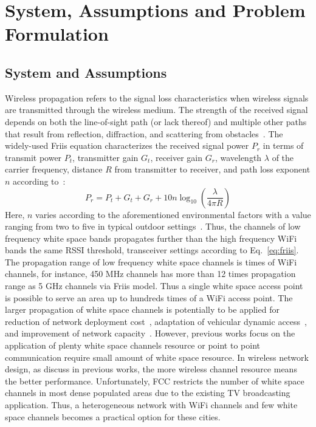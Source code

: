\section{System, Assumptions and Problem Formulation}
\label{sec:problemformulation}

\subsection{System and Assumptions}
\label{subsec:model}

Wireless propagation refers to the signal loss characteristics when wireless signals 
are transmitted through the wireless medium. The strength of the received signal depends on 
both the line-of-sight path (or lack thereof) and multiple other paths that result from reflection, 
diffraction, and scattering from obstacles~\cite{andersen1995propagation}. The widely-used Friis
equation characterizes the received signal power $P_r$ in terms of transmit power $P_t$, transmitter 
gain $G_t$, receiver gain $G_r$, wavelength $\lambda$ of the carrier frequency, distance $R$ from 
transmitter to receiver, and path loss exponent $n$ according to~\cite{friis}:
\begin{equation}
\label{eq:friis}
P_r=P_t+G_t+G_r+10n \log_{10}\left( \frac{\lambda}{4\pi R}\right)
\end{equation}
Here, $n$ varies according to the aforementioned environmental 
factors with a value ranging from two to five in typical outdoor 
settings~\cite{rappaport}.
Thus, the channels of low frequency white space bands propagates further than the high frequency WiFi 
bands the same RSSI threshold, transceiver settings according to Eq.~\ref{eq:friis}. 
The propagation range of low frequency white space channels is times of WiFi channels, for instance, 
450 MHz channels has more than 12 times propagation range as 5 GHz channels via Friis model. Thus a 
single white space access point is possible to serve an area up to hundreds times of a WiFi access point. 
The larger propagation of white space channels is potentially to be applied for reduction of network deployment 
cost~\cite{pcuiwinmee}, adaptation of vehicular dynamic access~\cite{chen2011feasibility}, and improvement 
of network capacity~\cite{bahl2009white}.
However, previous works focus on the application of plenty white space channels resource or point to point 
communication require small amount of white space resource. 
In wireless network design, as discuss in previous works, the more wireless channel resource means the better 
performance.
Unfortunately, FCC restricts the number of white space channels in most dense populated areas due to the existing 
TV broadcasting application. Thus, a heterogeneous network with WiFi channels and few white space channels 
becomes a practical option for these cities.



